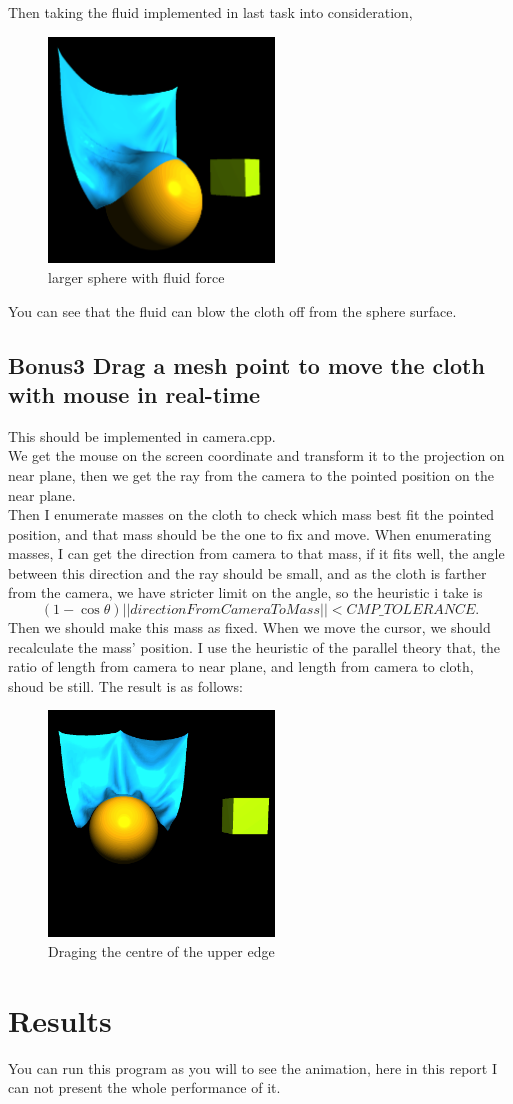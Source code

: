 \documentclass[acmtog]{acmart}
\begin{document}
Then taking the fluid implemented in last task into consideration,
\begin{figure}[h]
	\includegraphics[width=6cm,height=6cm]{wind2.png}
	\caption{larger sphere with fluid force}
\end{figure}
You can see that the fluid can blow the cloth off from the sphere surface.
\subsection{Bonus3 Drag a mesh point to move the cloth with mouse in real-time}
This should be implemented in camera.cpp.\\
We get the mouse on the screen coordinate and transform it to the projection on near plane, then we get the ray from the camera to the pointed position on the near plane.\\
Then I enumerate masses on the cloth to check which mass best fit the pointed position, and that mass should be the one to fix and move. When enumerating masses, I can get the direction from camera to that mass, if it fits well, the angle between this direction and the ray should be small, and as the cloth is farther from the camera, we have stricter limit on the angle, so the heuristic i take is 
$$(1 - \cos\theta)||directionFromCameraToMass|| < CMP\_TOLERANCE.$$
Then we should make this mass as fixed. When we move the cursor, we should recalculate the mass' position. I use the heuristic of the parallel theory that, the ratio of length from camera to near plane, and length from camera to cloth, shoud be still.
The result is as follows:
\begin{figure}[h]
	\includegraphics[width=6cm,height=6cm]{fixedMass.png}
	\caption{Draging the centre of the upper edge}
\end{figure}
\section{Results}
You can run this program as you will to see the animation, here in this report I can not present the whole performance of it.
\end{document}
